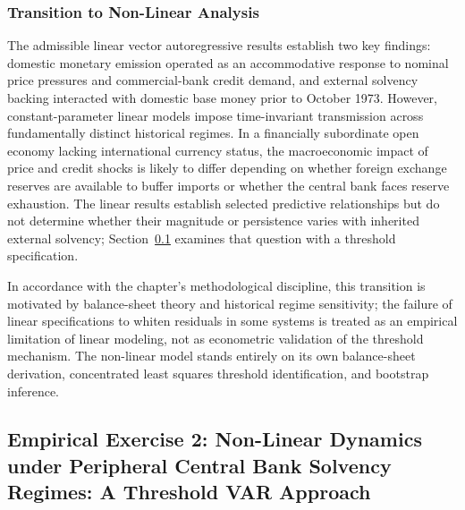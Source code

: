 \subsubsection{Transition to Non-Linear Analysis}
\label{sec:granger_transition}
\label{sec:granger_discussion}

The admissible linear vector autoregressive results establish two key findings: domestic monetary emission operated as an accommodative response to nominal price pressures and commercial-bank credit demand, and external solvency backing interacted with domestic base money prior to October 1973. However, constant-parameter linear models impose time-invariant transmission across fundamentally distinct historical regimes. In a financially subordinate open economy lacking international currency status, the macroeconomic impact of price and credit shocks is likely to differ depending on whether foreign exchange reserves are available to buffer imports or whether the central bank faces reserve exhaustion. The linear results establish selected predictive relationships but do not determine whether their magnitude or persistence varies with inherited external solvency; Section~\ref{sec:tvar_solvency_regimes} examines that question with a threshold specification.

In accordance with the chapter's methodological discipline, this transition is motivated by balance-sheet theory and historical regime sensitivity; the failure of linear specifications to whiten residuals in some systems is treated as an empirical limitation of linear modeling, not as econometric validation of the threshold mechanism. The non-linear model stands entirely on its own balance-sheet derivation, concentrated least squares threshold identification, and bootstrap inference.



\subsection{Empirical Exercise 2: Non-Linear Dynamics under Peripheral Central Bank Solvency Regimes: A Threshold VAR Approach}
\label{sec:tvar_solvency_regimes}


